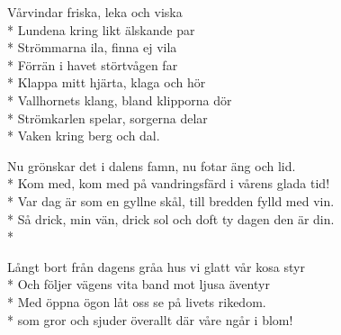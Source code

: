\begin{SongText}
    \begin{Verse}
        Vårvindar friska, leka och viska\\*%
        Lundena kring likt älskande par\\*%
        Strömmarna ila, finna ej vila\\*%
        Förrän i havet störtvågen far\\*%
        Klappa mitt hjärta, klaga och hör\\*%
        Vallhornets klang, bland klipporna dör\\*%
        Strömkarlen spelar, sorgerna delar\\*%
        Vaken kring berg och dal.
    \end{Verse}
\end{SongText}

\begin{SongText}
    \begin{Verse}
        Nu grönskar det i dalens famn, nu fotar äng och lid.\\*%
        Kom med, kom med på vandringsfärd i vårens glada tid!\\*%
        Var dag är som en gyllne skål, till bredden fylld med vin.\\*%
        Så drick, min vän, drick sol och doft ty dagen den är din.\\*%
    \end{Verse}
    \begin{Verse}
        Långt bort från dagens gråa hus vi glatt vår kosa styr\\*%
        Och följer vägens vita band mot ljusa äventyr\\*%
        Med öppna ögon låt oss se på livets rikedom.\\*%
        som gror och sjuder överallt där våre ngår i blom!
    \end{Verse}
\end{SongText}

